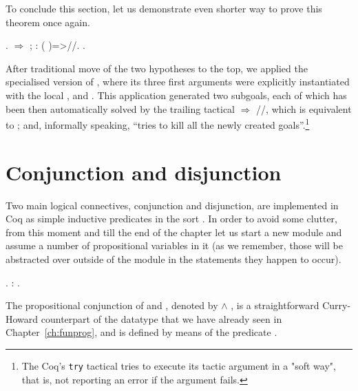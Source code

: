 To conclude this section, let us demonstrate even shorter way to prove
this theorem once again.


\begin{coqdoccode}
\coqdocemptyline
\coqdocnoindent
{}.\coqdoceol
\coqdocnoindent
{}\ensuremath{\Rightarrow} ; : (   )=>//.\coqdoceol
\coqdocnoindent
{}.\coqdoceol
\coqdocemptyline
\end{coqdoccode}


After traditional move of the two hypotheses to the top, we applied
the specialised version of , where its three first
arguments were explicitly instantiated with the local ,  and
. This application generated two subgoals, each of which has been
then automatically solved by the trailing tactical \ssrtl{//}\ensuremath{\Rightarrow}
//, which is equivalent to ;  and, informally speaking,
``tries to kill all the newly created goals''.\footnote{The Coq's
\texttt{try} tactical tries to execute its tactic argument in a "soft
way", that is, not reporting an error if the argument fails.}




\section{Conjunction and disjunction}


\label{sec:conjdisj}


Two main logical connectives, conjunction and disjunction, are
implemented in Coq as simple inductive predicates in the sort
. In order to avoid some clutter, from this moment and till the
end of the chapter let us start a new module  and assume
a number of propositional variables in it (as we remember, those will
be abstracted over outside of the module in the statements
they happen to occur).


\begin{coqdoccode}
\coqdocemptyline
\coqdocnoindent
{} .\coqdoceol
\coqdocnoindent
{}   : .\coqdoceol
\coqdocemptyline
\end{coqdoccode}


The propositional conjunction of  and , denoted by  \ensuremath{\land} , is
a straightforward Curry-Howard counterpart of the  datatype that
we have already seen in Chapter~\ref{ch:funprog}, and is defined by
means of the predicate .


